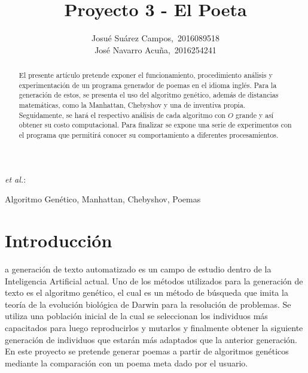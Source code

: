 \documentclass[journal]{IEEEtran}
\begin{document}
\title{Proyecto 3 - El Poeta}


\author{Josué Suárez Campos,~2016089518\\
       José Navarro Acuña,~2016254241 }
 
{\MakeLowercase{\textit{et al.}}:}

\maketitle


\begin{abstract}
El presente artículo pretende exponer el funcionamiento, procedimiento análisis y experimentación de un programa generador de poemas en el idioma inglés. Para la generación de estos, se presenta el uso del algoritmo genético, además de distancias matemáticas, como la Manhattan, Chebyshov y una de inventiva propia. Seguidamente, se hará el respectivo análisis de cada algoritmo con $O$ grande y así obtener su costo computacional. Para finalizar se expone una serie de experimentos con el programa que permitirá conocer su comportamiento a diferentes procesamientos.
\end{abstract}

\renewcommand{\IEEEkeywordsname}{Palabra clave}
\begin{IEEEkeywords}
Algoritmo Genético, Manhattan, Chebyshov, Poemas
\end{IEEEkeywords}


\IEEEpeerreviewmaketitle


\section{Introducción}

a generación de texto automatizado es un campo de estudio dentro de la Inteligencia Artificial actual. Uno de los métodos utilizados para la generación de texto es el algoritmo genético, el cual es un método de búsqueda que imita la teoría de la evolución biológica de Darwin para la resolución de problemas. Se utiliza una población inicial de la cual se seleccionan los individuos más capacitados para luego reproducirlos y mutarlos y finalmente obtener la siguiente generación de individuos que estarán más adaptados que la anterior generación. En este proyecto se pretende generar poemas a partir de algoritmos genéticos mediante la comparación con un poema meta dado por el usuario. 
\end{document}
